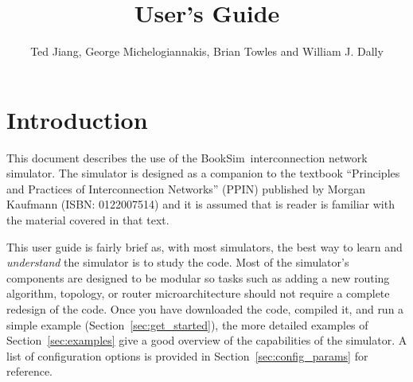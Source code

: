 \documentclass[11pt]{article}
\author{Ted Jiang, George Michelogiannakis, Brian Towles and William J. Dally}
\title{\simname 2.0 User's Guide}
\newcommand{\simname}{BookSim~}
\begin{document}
\maketitle
\tableofcontents

\pagestyle{fancy}
\renewcommand{\sectionmark}[1]{\markright{\thesection\ #1}}
\fancyhf{} %
\fancyhead[LE,RO]{\bfseries\thepage}
\fancyhead[LO]{\bfseries\rightmark}
\fancyhead[RE]{\bfseries\leftmark}
\renewcommand{\headrulewidth}{0.5pt}
\renewcommand{\footrulewidth}{0.5pt}
\addtolength{\headheight}{0.5pt} %
\cfoot{\small\today}
\fancypagestyle{plain}{%
    \fancyhf{} %
    \renewcommand{\headrulewidth}{0pt} %
    \renewcommand{\footrulewidth}{0pt} %
} 



\newenvironment{opt_list}[1]{\begin{list}{}{\renewcommand{\makelabel}[1]%
{\texttt{##1}\hfil}\settowidth{\labelwidth}{\texttt{#1}}\setlength{\leftmargin}%
{\labelwidth+\labelsep}}}{\end{list}}

\section{Introduction}

This document describes the use of the \simname interconnection
network simulator.  The simulator is designed as a companion to the
textbook ``Principles and Practices of Interconnection Networks''
(PPIN) published by Morgan Kaufmann (ISBN: 0122007514) and it is
assumed that is reader is familiar with the material covered in that
text.

This user guide is fairly brief as, with most simulators, the best way
to learn and {\it understand} the simulator is to study the code.
Most of the simulator's components are designed to be modular so tasks
such as adding a new routing algorithm, topology, or router
microarchitecture should not require a complete redesign of the code.
Once you have downloaded the code, compiled it, and run a simple
example (Section~\ref{sec:get_started}), the more detailed examples of
Section~\ref{sec:examples} give a good overview of the capabilities of
the simulator.  A list of configuration options is provided in
Section~\ref{sec:config_params} for reference.
\end{document}
